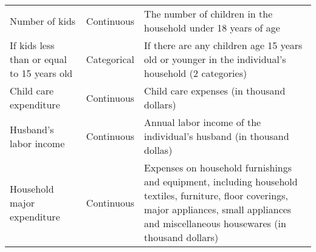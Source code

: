 \begin{flushleft}
\begin{table}[ht]
{\begin{minipage}{\textwidth}
\begin{tabular}{ p{5cm}|p{3cm}|p{12cm}  }
\hline
Number of kids & \centering Continuous & The number of children in the household under 18 years of age \\
If kids less than or equal to 15 years old & \centering Categorical & If there are any children age 15 years old or younger in the individual's household (2 categories)\\
Child care expenditure & \centering Continuous & Child care expenses (in thousand dollars)\\
Husband's labor income & \centering Continuous & Annual labor income of the individual's husband (in thousand dollas) \\
Household major expenditure & \centering Continuous & Expenses on household furnishings and equipment, including household textiles, furniture, floor coverings, major appliances, small appliances and miscellaneous housewares (in thousand dollars)\\
\hline \hline
\end{tabular}
\bigskip
\bigskip
\end{minipage}}
\begin{center}
\vspace{-.5cm}
  \end{center}
\end{table}

\end{flushleft}
